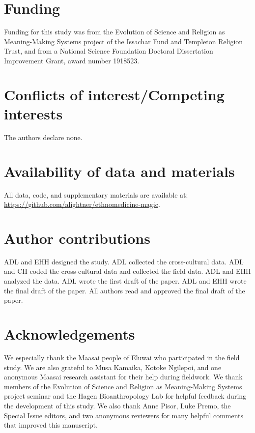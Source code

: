 \documentclass[
  11pt,
]{article}
\begin{document}
\hypertarget{funding}{%
\section{Funding}\label{funding}}

Funding for this study was from the Evolution of Science and Religion as Meaning-Making Systems project of the Issachar Fund and Templeton Religion Trust, and from a National Science Foundation Doctoral Dissertation Improvement Grant, award number 1918523.

\hypertarget{conflicts-of-interestcompeting-interests}{%
\section{Conflicts of interest/Competing interests}\label{conflicts-of-interestcompeting-interests}}

The authors declare none.

\hypertarget{availability-of-data-and-materials}{%
\section{Availability of data and materials}\label{availability-of-data-and-materials}}

All data, code, and supplementary materials are available at: \url{https://github.com/alightner/ethnomedicine-magic}.

\hypertarget{author-contributions}{%
\section{Author contributions}\label{author-contributions}}

ADL and EHH designed the study. ADL collected the cross-cultural data. ADL and CH coded the cross-cultural data and collected the field data. ADL and EHH analyzed the data. ADL wrote the first draft of the paper. ADL and EHH wrote the final draft of the paper. All authors read and approved the final draft of the paper.

\hypertarget{acknowledgements}{%
\section{Acknowledgements}\label{acknowledgements}}

We especially thank the Maasai people of Eluwai who participated in the field study. We are also grateful to Musa Kamaika, Kotoke Ngilepoi, and one anonymous Maasai research assistant for their help during fieldwork. We thank members of the Evolution of Science and Religion as Meaning-Making Systems project seminar and the Hagen Bioanthropology Lab for helpful feedback during the development of this study. We also thank Anne Pisor, Luke Premo, the Special Issue editors, and two anonymous reviewers for many helpful comments that improved this manuscript.
\end{document}
